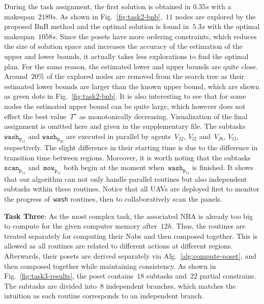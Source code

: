 During the task assignment,
the first solution is obtained in $0.35s$ with a makespan~$2189s$.
As shown in Fig.~\ref{fig:task2-bnb},~$11$ nodes are explored by the proposed BnB method and
the optimal solution is found in~$5.3s$ with the optimal makespan~$1058s$.
Since the posets have more ordering constraints,
which reduces the size of solution space and increases the accuracy of the estimation
of the upper and lower bounds,
it actually takes less explorations to find the optimal plan.
For the same reason, the estimated lower and upper bounds are quite close.
Around~$20\%$ of the explored nodes are removed from the search tree
as their estimated lower bounds are larger than the known upper bound,
which are shown as green dots in Fig.~\ref{fig:task2-bnb}.
It is also interesting to see that for some nodes the estimated upper bound
can be quite large,
which however does not effect the best value~$T^\star$
as monotonically decreasing.
Visualization of the final assignment is omitted here
and given in the supplementary file.
The subtasks~$\texttt{wash}_{\texttt{p}_{11}}$ and
$\texttt{wash}_{\texttt{p}_{20}}$ are executed in parallel by
agents~$V_{f2}$, $V_{l2}$ and~$V_{f6}$, $V_{l3}$, respectively.
The slight difference in their starting time is due to the difference
in transition time between regions.
Moreover, it is worth noting that
the subtasks~$\texttt{scan}_{\texttt{p}_{11}}$ and~$\texttt{mow}_{\texttt{p}_{11}}$
both begin at the moment when~$\texttt{wash}_{\texttt{p}_{11}}$ is finished.
It shows that our algorithm can not only handle parallel routines but also
independent subtasks within these routines.
Notice that all UAVs are deployed first to monitor the progress
of~\texttt{wash} routines, then to collaboratively scan the panels.

\textbf{Task Three}:
As the most complex task,
the associated NBA is already too big to compute for the given computer memory
after~$12h$.
Thus, the routines are treated separately for computing their Nabs and then
composed together.
This is allowed as all routines are related to different actions at different
regions.
Afterwards, their posets are derived separately via Alg.~\ref{alg:compute-poset},
and then composed together  while maintaining consistency.
As shown in Fig.~\ref{fig:task3-results},
the poset contains~$18$ subtasks and~$22$ partial constrains.
The subtasks are divided into~$8$ independent branches,
which matches the intuition as each routine corresponds to an independent branch.

